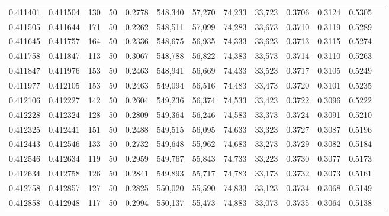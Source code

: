 \begin{tabular}{rrrrrrrrrrrrr}
0.411401 & 0.411504 &   130 &  50 &                                     0.2778 & 548,340 &  57,270 &  74,233 &  33,723 & 0.3706 & 0.3124 & 0.5305 \\
0.411505 & 0.411644 &   171 &  50 &                                     0.2262 & 548,511 &  57,099 &  74,283 &  33,673 & 0.3710 & 0.3119 & 0.5289 \\
0.411645 & 0.411757 &   164 &  50 &                                     0.2336 & 548,675 &  56,935 &  74,333 &  33,623 & 0.3713 & 0.3115 & 0.5274 \\
0.411758 & 0.411847 &   113 &  50 &                                     0.3067 & 548,788 &  56,822 &  74,383 &  33,573 & 0.3714 & 0.3110 & 0.5263 \\
0.411847 & 0.411976 &   153 &  50 &                                     0.2463 & 548,941 &  56,669 &  74,433 &  33,523 & 0.3717 & 0.3105 & 0.5249 \\
0.411977 & 0.412105 &   153 &  50 &                                     0.2463 & 549,094 &  56,516 &  74,483 &  33,473 & 0.3720 & 0.3101 & 0.5235 \\
0.412106 & 0.412227 &   142 &  50 &                                     0.2604 & 549,236 &  56,374 &  74,533 &  33,423 & 0.3722 & 0.3096 & 0.5222 \\
0.412228 & 0.412324 &   128 &  50 &                                     0.2809 & 549,364 &  56,246 &  74,583 &  33,373 & 0.3724 & 0.3091 & 0.5210 \\
0.412325 & 0.412441 &   151 &  50 &                                     0.2488 & 549,515 &  56,095 &  74,633 &  33,323 & 0.3727 & 0.3087 & 0.5196 \\
0.412443 & 0.412546 &   133 &  50 &                                     0.2732 & 549,648 &  55,962 &  74,683 &  33,273 & 0.3729 & 0.3082 & 0.5184 \\
0.412546 & 0.412634 &   119 &  50 &                                     0.2959 & 549,767 &  55,843 &  74,733 &  33,223 & 0.3730 & 0.3077 & 0.5173 \\
0.412634 & 0.412758 &   126 &  50 &                                     0.2841 & 549,893 &  55,717 &  74,783 &  33,173 & 0.3732 & 0.3073 & 0.5161 \\
0.412758 & 0.412857 &   127 &  50 &                                     0.2825 & 550,020 &  55,590 &  74,833 &  33,123 & 0.3734 & 0.3068 & 0.5149 \\
0.412858 & 0.412948 &   117 &  50 &                                     0.2994 & 550,137 &  55,473 &  74,883 &  33,073 & 0.3735 & 0.3064 & 0.5138 \\

\end{tabular}
